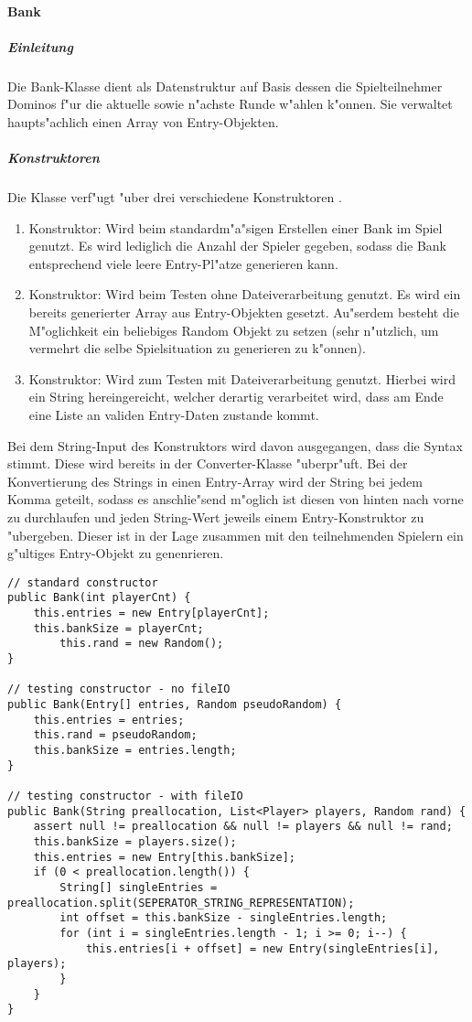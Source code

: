 \paragraph{Bank}
\label{par:bank}

\subparagraph{Einleitung}
Die Bank-Klasse dient als Datenstruktur auf Basis dessen die Spielteilnehmer Dominos f"ur die aktuelle sowie n"achste Runde w"ahlen k"onnen. Sie verwaltet haupts"achlich einen Array von Entry-Objekten. 

\subparagraph{Konstruktoren}
Die Klasse verf"ugt "uber drei verschiedene Konstruktoren .
\begin{enumerate}
	\item Konstruktor: Wird beim standardm"a"sigen Erstellen einer Bank im Spiel genutzt. Es wird lediglich die Anzahl der Spieler gegeben, sodass die Bank entsprechend viele leere Entry-Pl"atze generieren kann. 
	\item Konstruktor: Wird beim Testen ohne Dateiverarbeitung genutzt. Es wird ein bereits generierter Array aus Entry-Objekten gesetzt. Au"serdem besteht die M"oglichkeit ein beliebiges Random Objekt zu setzen (sehr n"utzlich, um vermehrt die selbe Spielsituation zu generieren zu k"onnen). 
	\item Konstruktor: Wird zum Testen mit Dateiverarbeitung genutzt. Hierbei wird ein String hereingereicht, welcher derartig verarbeitet wird, dass am Ende eine Liste an validen Entry-Daten zustande kommt. 
\end{enumerate}
Bei dem String-Input des Konstruktors wird davon ausgegangen, dass die Syntax stimmt. Diese wird bereits in der Converter-Klasse "uberpr"uft. Bei der Konvertierung des Strings in einen Entry-Array wird der String bei jedem Komma geteilt, sodass es anschlie"send m"oglich ist diesen von hinten nach vorne zu durchlaufen und jeden String-Wert jeweils einem Entry-Konstruktor zu "ubergeben. Dieser ist in der Lage zusammen mit den teilnehmenden Spielern ein g"ultiges Entry-Objekt zu genenrieren. 
\begin{lstlisting}[style=CodeHighlighting,float,caption=Bank - Konstruktor,label=lst:bank_konstruktor]
// standard constructor 
public Bank(int playerCnt) {
    this.entries = new Entry[playerCnt];
    this.bankSize = playerCnt;
        this.rand = new Random();
}

// testing constructor - no fileIO
public Bank(Entry[] entries, Random pseudoRandom) {
    this.entries = entries;
    this.rand = pseudoRandom;
    this.bankSize = entries.length;
}

// testing constructor - with fileIO
public Bank(String preallocation, List<Player> players, Random rand) {
    assert null != preallocation && null != players && null != rand;
    this.bankSize = players.size();
    this.entries = new Entry[this.bankSize];
    if (0 < preallocation.length()) {
        String[] singleEntries = preallocation.split(SEPERATOR_STRING_REPRESENTATION);
        int offset = this.bankSize - singleEntries.length;
        for (int i = singleEntries.length - 1; i >= 0; i--) {
            this.entries[i + offset] = new Entry(singleEntries[i], players);
        }
    }
}
\end{lstlisting}

